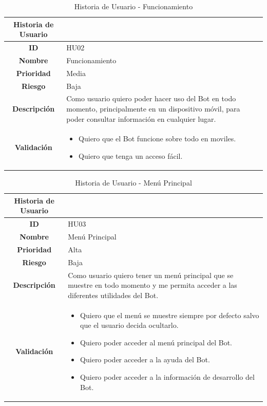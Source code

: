 \begin{table}[H]
	\begin{center}
		\begin{tabular}{| c | p{9cm} |}
			\hline
			
			Historia de Usuario &  \\ \hline
			
			
			\textbf{ID} & HU02 \\
			\textbf{Nombre} & Funcionamiento \\
			\textbf{Prioridad} & Media \\
			\textbf{Riesgo} & Baja \\
			\textbf{Descripción} & Como usuario quiero poder hacer uso del Bot en todo momento, principalmente en un dispositivo móvil, para poder consultar información en cualquier lugar. \\
			\textbf{Validación} & \begin{itemize}
				\item Quiero que el Bot funcione sobre todo en moviles.
				\item Quiero que tenga un acceso fácil.
			\end{itemize} \\ \hline
		\end{tabular}
		\caption{Historia de Usuario - Funcionamiento}
	\end{center}
\end{table}

\begin{table}[H]
	\begin{center}
		\begin{tabular}{| c | p{9cm} |}
			\hline
			
			Historia de Usuario &  \\ \hline
			
			
			\textbf{ID} & HU03 \\
			\textbf{Nombre} & Menú Principal \\
			\textbf{Prioridad} & Alta \\
			\textbf{Riesgo} & Baja \\
			\textbf{Descripción} & Como usuario quiero tener un menú principal que se muestre en todo momento y me permita acceder a las diferentes utilidades del Bot. \\
			\textbf{Validación} & \begin{itemize}
				\item Quiero que el menú se muestre siempre por defecto salvo que el usuario decida ocultarlo.
				\item Quiero poder acceder al menú principal del Bot.
				\item Quiero poder acceder a la ayuda del Bot.
				\item Quiero poder acceder a la información de desarrollo del Bot.
			\end{itemize} \\ \hline
		\end{tabular}
		\caption{Historia de Usuario - Menú Principal}
	\end{center}
\end{table}

